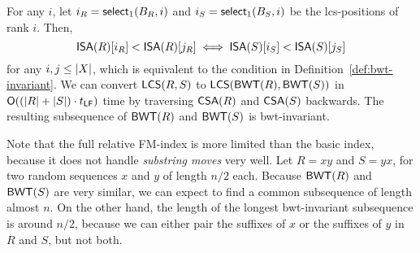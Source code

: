 For any $i$, let $i_{R} = \mathsf{select}_{1}(B_{R}, i)$ and $i_{S} =
\mathsf{select}_{1}(B_{S}, i)$ be the lcs-positions of rank $i$. Then,
$$
\mathsf{ISA}(R)[i_{R}] < \mathsf{ISA}(R)[j_{R}] \iff \mathsf{ISA}(S)[i_{S}] < \mathsf{ISA}(S)[j_{S}]
$$
for any $i,j \le \lvert X \rvert$, which is equivalent to the condition in
Definition~\ref{def:bwt-invariant}. We can convert $\mathsf{LCS}(R,S)$ to
$\mathsf{LCS}(\mathsf{BWT}(R),\mathsf{BWT}(S))$ in $\mathsf{O}((\lvert R \rvert+\lvert S \rvert) \cdot t_{\mathsf{LF}})$ time by
traversing $\mathsf{CSA}(R)$ and $\mathsf{CSA}(S)$ backwards. The resulting subsequence of
$\mathsf{BWT}(R)$ and $\mathsf{BWT}(S)$ is bwt-invariant.

Note that the full relative FM-index is more limited than the basic index,
because it does not handle \emph{substring moves} very well. Let $R = xy$ and
$S = yx$, for two random sequences $x$ and $y$ of length $n/2$ each. Because
$\mathsf{BWT}(R)$ and $\mathsf{BWT}(S)$ are very similar, we can expect to find a common
subsequence of length almost $n$. On the other hand, the length of the longest
bwt-invariant subsequence is around $n/2$, because we can either pair the
suffixes of $x$ or the suffixes of $y$ in $R$ and $S$, but not both.


